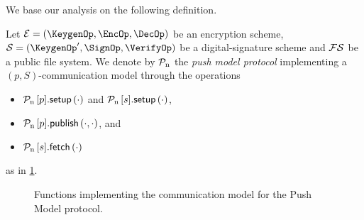 We base our analysis on the following definition.

\begin{definition}\label{PushModel}
  Let \(\mathcal{E} = (\KeygenOp, \EncOp, \DecOp)\) be an encryption scheme, 
  \(\mathcal{S} = (\KeygenOp^\prime, \SignOp, \VerifyOp)\) be  
  a digital-signature scheme and \(\operatorname{\mathcal{FS}}\) be a public file system.
  We denote by \(\operatorname{\mathcal{P}_n}\) the \emph{push model protocol} implementing a \((p, 
    S)\)-communication model through the operations
  \begin{itemize}
    \item \(\pnsetup{p}[\cdot]\) and \(\pnsetup{s}[\cdot]\),
    \item \(\pnpub{p}[\cdot][\cdot]\), and
    \item \(\pnget{s}[\cdot]\)
  \end{itemize}
  as in \cref{PushFunctions}.
\end{definition}

\begin{figure}[p]
  \caption{%
    Functions implementing the communication model for the Push Model protocol.
  }\label{PushFunctions}
\end{figure}

